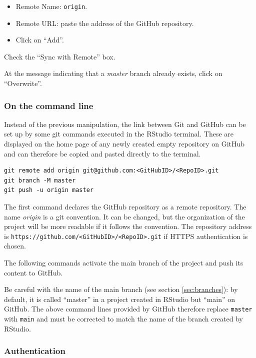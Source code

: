 \documentclass[
  12pt,
  american,
  a4paper,
  extrafontsizes,onecolumn,openright
  ]{memoir}
\providecommand{\tightlist}{%
  \setlength{\itemsep}{0pt}\setlength{\parskip}{0pt}}
\begin{document}
\begin{itemize}
\tightlist
\item
  Remote Name: \texttt{origin}.
\item
  Remote URL: paste the address of the GitHub repository.
\item
  Click on \enquote{Add}.
\end{itemize}

Check the \enquote{Sync with Remote} box.

At the message indicating that a \emph{master} branch already exists, click on \enquote{Overwrite}.

\subsubsection{On the command line}\label{on-the-command-line}

Instead of the previous manipulation, the link between Git and GitHub can be set up by some git commands executed in the RStudio terminal.
These are displayed on the home page of any newly created empty repository on GitHub and can therefore be copied and pasted directly to the terminal.

\begin{verbatim}
git remote add origin git@github.com:<GitHubID>/<RepoID>.git
git branch -M master
git push -u origin master
\end{verbatim}

The first command declares the GitHub repository as a remote repository.
The name \emph{origin} is a git convention.
It can be changed, but the organization of the project will be more readable if it follows the convention.
The repository address is \texttt{https://github.com/\textless{}GitHubID\textgreater{}/\textless{}RepoID\textgreater{}.git} if HTTPS authentication is chosen.

The following commands activate the main branch of the project and push its content to GitHub.

Be careful with the name of the main branch (see section \ref{sec:branches}): by default, it is called \enquote{master} in a project created in RStudio but \enquote{main} on GitHub.
The above command lines provided by GitHub therefore replace \texttt{master} with \texttt{main} and must be corrected to match the name of the branch created by RStudio.

\subsubsection{Authentication}\label{authentication}
\end{document}
